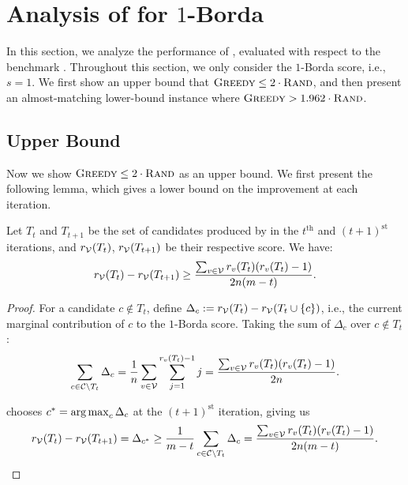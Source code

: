 \section{Analysis of \g{} for $1$-Borda}
\label{sec:greedy}
In this section, we analyze the performance of \g{}, evaluated with respect to the benchmark \rand{}. Throughout this section, we only consider the $1$-Borda score, i.e., $s = 1$. We first show an upper bound that ${\normalfont\textsc{Greedy}} \leq 2 \cdot {\normalfont\textsc{Rand}}$, and then present an almost-matching lower-bound instance where ${\normalfont\textsc{Greedy}} > 1.962 \cdot {\normalfont\textsc{Rand}}$.

\subsection{Upper Bound}
\label{sec:greedy_ub}
Now we show ${\normalfont\textsc{Greedy}} \leq 2 \cdot {\normalfont\textsc{Rand}}$ as an upper bound. We first present the following lemma, which gives a lower bound on the improvement at each iteration.
\begin{lemma}
Let $T_t$ and $T_{t + 1}$ be the set of candidates produced by \g{} in the $t^{\text{th}}$ and $(t + 1)^{\text{st}}$ iterations, and $r_{\mathcal{V}}(T_t)$, $r_{\mathcal{V}}(T_{t + 1})$ be their respective score. We have:
\[
r_{\mathcal{V}}(T_t) - r_{\mathcal{V}}(T_{t + 1}) \geq \frac{\sum_{v \in \mathcal{V}} r_v(T_t)(r_v(T_t) - 1)}{2n(m - t)}.
\]
\label{lem:minimum_improvement}
\end{lemma}
\begin{proof}
For a candidate $c \notin T_t$, define $\Delta_c := r_{\mathcal{V}}(T_t) - r_{\mathcal{V}}(T_t \cup \{c\})$, i.e., the current marginal contribution of $c$ to the $1$-Borda score. Taking the sum of $\Delta_c$ over $c \notin T_t$:
\[
\sum_{c \in \mathcal{C} \setminus T_t} \Delta_c = \frac{1}{n} \sum_{v \in \mathcal{V}} \sum_{j = 1}^{r_v(T_t) - 1} j = \frac{\sum_{v \in \mathcal{V}} r_v(T_t)(r_v(T_t) - 1)}{2n}.
\]

\g{} chooses $c^* = \operatorname{arg\,max}_c \Delta_c$ at the $(t + 1)^{\text{st}}$ iteration, giving us
\[
r_{\mathcal{V}}(T_t) - r_{\mathcal{V}}(T_{t + 1}) = \Delta_{c^*} \geq \frac{1}{m - t} \sum_{c \in \mathcal{C} \setminus T_t} \Delta_c = \frac{\sum_{v \in \mathcal{V}} r_v(T_t)(r_v(T_t) - 1)}{2n(m - t)}. \qedhere
\]
\end{proof}

